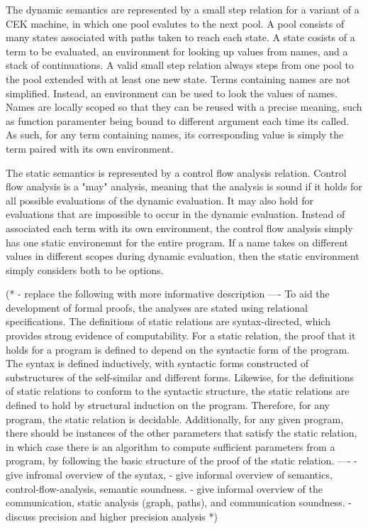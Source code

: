 \documentclass[letterpaper, 11pt]{extarticle}
\begin{document}
The dynamic semantics are represented by a small step relation for a variant of a CEK machine, in which one pool evalutes
to the next pool. A pool consists of many states associated with paths taken to reach each state.  A state cosists
of a term to be evaluated, an environment for looking up values from names, and a stack of continuations.
A valid small step relation always steps from one pool to the pool extended with at least one new state.
Terms containing names are not simplified.  Instead, an environment can be used to look the values of names.
Names are locally scoped so that they can be reused with a precise meaning, such as function paramenter being bound to
different argument each time its called. As such, for any term containing names, its corresponding value is simply
the term paired with its own environment.

The static semantics is represented by a control flow analysis relation. Control flow analysis is a "may" analysis,
meaning that the analysis is sound if it holds for all possible evaluations of the dynamic evaluation.
It may also hold for evaluations that are impossible to occur in the dynamic evaluation.
Instead of associated each term with its own environment, the control flow analysis simply has one static environemnt
for the entire program. If a name takes on different values in different scopes during dynamic evaluation, then
the static environment simply considers both to be options.   



(*
- replace the following with more informative description
----
To aid the development of formal proofs, the analyses are stated using relational specifications.
The definitions of static relations are syntax-directed, which provides
strong evidence of computability.
For a static relation, the proof that it holds for a program is defined
to depend on the syntactic form of the program.
The syntax is defined inductively, with syntactic forms constructed of 
substructures of the self-similar and different forms.   
Likewise, for the definitions of static relations to conform to the
syntactic structure, the static relations are defined to hold
by structural induction on the program.
Therefore, for any program, the static relation is decidable.
Additionally, for any given program, there should be instances of the other
parameters that satisfy the static relation, in which case there is an
algorithm to compute sufficient parameters from a program,
by following the basic structure of the proof of the static relation.
----
- give infromal overview of the syntax,
- give informal overview of semantics, control-flow-analysis, semantic soundness.
- give informal overview of the communication, static analysis (graph, paths), and communication soundness. 
- discuss precision and higher precision analysis
*)
\end{document}
